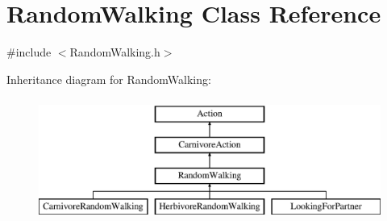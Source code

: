 \hypertarget{class_random_walking}{}\section{Random\+Walking Class Reference}
\label{class_random_walking}


{\ttfamily \#include $<$Random\+Walking.\+h$>$}

Inheritance diagram for Random\+Walking\+:\begin{figure}[H]
\begin{center}
\leavevmode
\includegraphics[height=4.000000cm]{class_random_walking}
\end{center}
\end{figure}
